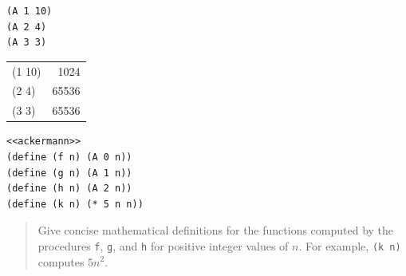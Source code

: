 \documentclass[final,fleqn,titlepage]{article}
\begin{document}
\begin{verbatim}
(A 1 10)
(A 2 4)
(A 3 3)
\end{verbatim}
\begin{center}
\begin{tabular}{lr}
(1 10) & 1024\\
(2 4) & 65536\\
(3 3) & 65536\\
\end{tabular}
\end{center}

\begin{verbatim}
<<ackermann>>
(define (f n) (A 0 n))
(define (g n) (A 1 n))
(define (h n) (A 2 n))
(define (k n) (* 5 n n))
\end{verbatim}

\begin{quote}
Give concise mathematical definitions for the functions computed by the
procedures \texttt{f}, \texttt{g}, and \texttt{h} for positive integer values of \(n\). For example,
\texttt{(k n)} computes \(5n^2\).
\end{quote}
\end{document}
